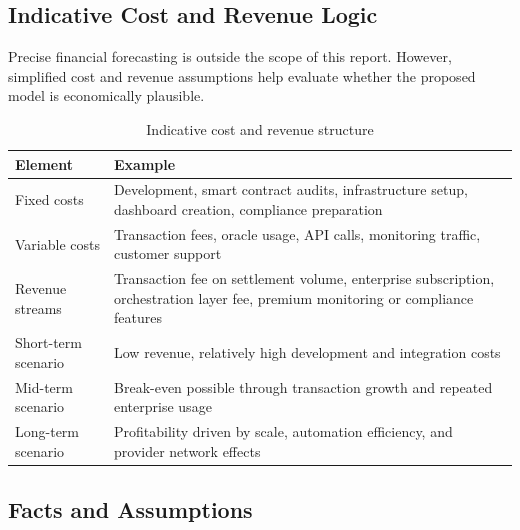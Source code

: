 \documentclass[12pt,a4paper,oneside]{article}
\theoremstyle{definition}
\theoremstyle{plain}
\begin{document}
\subsection{Indicative Cost and Revenue Logic}

Precise financial forecasting is outside the scope of this report. However, simplified cost and revenue assumptions help evaluate whether the proposed model is economically plausible.

\begin{table}[H]
\centering
\caption{Indicative cost and revenue structure}
\label{tab:costrevenue}
\begin{tabular}{p{4.8cm}p{9.2cm}}
\toprule
\textbf{Element} & \textbf{Example} \\
\midrule
Fixed costs & Development, smart contract audits, infrastructure setup, dashboard creation, compliance preparation \\
Variable costs & Transaction fees, oracle usage, API calls, monitoring traffic, customer support \\
Revenue streams & Transaction fee on settlement volume, enterprise subscription, orchestration layer fee, premium monitoring or compliance features \\
Short-term scenario & Low revenue, relatively high development and integration costs \\
Mid-term scenario & Break-even possible through transaction growth and repeated enterprise usage \\
Long-term scenario & Profitability driven by scale, automation efficiency, and provider network effects \\
\bottomrule
\end{tabular}
\end{table}

\subsection{Facts and Assumptions}
\end{document}
